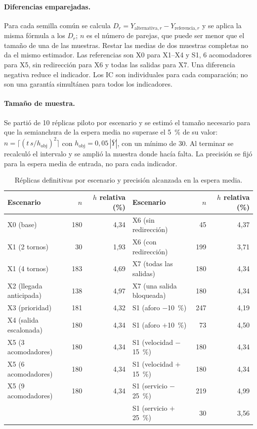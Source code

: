 \paragraph{Diferencias emparejadas.} Para cada semilla común se calcula
$D_r = Y_{\text{alternativa},r} - Y_{\text{referencia},r}$ y se aplica la misma
fórmula a los $D_r$; $n$ es el número de parejas, que puede ser menor que el
tamaño de una de las muestras. Restar las medias de dos muestras completas no da
el mismo estimador. Las referencias son X0 para X1--X4 y S1, 6 acomodadores para
X5, sin redirección para X6 y todas las salidas para X7. Una diferencia negativa
reduce el indicador. Los IC son individuales para cada comparación; no son una
garantía simultánea para todos los indicadores.

\paragraph{Tamaño de muestra.} Se partió de 10 réplicas piloto por escenario y
se estimó el tamaño necesario para que la semianchura de la espera media no
superase el 5~\% de su valor:
$n = \lceil (t\,s/h_{\text{obj}})^2\rceil$ con $h_{\text{obj}} = 0{,}05\,|\bar Y|$,
con un mínimo de 30. Al terminar se recalculó el intervalo y se amplió la
muestra donde hacía falta. La precisión se fijó para la espera media de entrada,
no para cada indicador.

\begin{table}[htbp]
\centering\small
\caption{Réplicas definitivas por escenario y precisión alcanzada en la espera media.}
\label{tab:replicas}
\begin{tabular}{@{}lrr@{\hspace{2.5em}}lrr@{}}
\toprule
Escenario & $n$ & $h$ relativa (\%) & Escenario & $n$ & $h$ relativa (\%) \\
\midrule
X0 (base) & 180 & 4,34 & X6 (sin redirección) & 45 & 4,37 \\
X1 (2 tornos) & 30 & 1,93 & X6 (con redirección) & 199 & 3,71 \\
X1 (4 tornos) & 183 & 4,69 & X7 (todas las salidas) & 180 & 4,34 \\
X2 (llegada anticipada) & 138 & 4,97 & X7 (una salida bloqueada) & 180 & 4,34 \\
X3 (prioridad) & 181 & 4,32 & S1 (aforo $-$10~\%) & 247 & 4,19 \\
X4 (salida escalonada) & 180 & 4,34 & S1 (aforo $+$10~\%) & 73 & 4,50 \\
X5 (3 acomodadores) & 180 & 4,34 & S1 (velocidad $-$15~\%) & 180 & 4,34 \\
X5 (6 acomodadores) & 180 & 4,34 & S1 (velocidad $+$15~\%) & 180 & 4,34 \\
X5 (9 acomodadores) & 180 & 4,34 & S1 (servicio $-$25~\%) & 219 & 4,99 \\
 & & & S1 (servicio $+$25~\%) & 30 & 3,56 \\
\bottomrule
\end{tabular}
\end{table}

